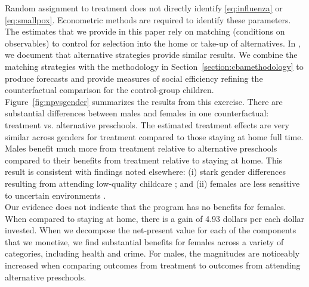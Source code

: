 \noindent Random assignment to treatment does not directly identify \eqref{eq:influenza} or \eqref{eq:smallpox}. Econometric methods are required to identify these parameters. The estimates that we provide in this paper rely on matching (conditions on observables) to control for selection into the home or take-up of alternatives. In \citet{Garcia_Heckman_Ziff_2017_Gender-Diff_UNPUBLISHED}, we document that alternative strategies provide similar results. We combine the matching strategies with the methodology in Section~\ref{section:cbamethodology} to produce forecasts and provide measures of social efficiency refining the counterfactual comparison for the control-group children.\\

\noindent Figure~\ref{fig:npvsgender} summarizes the results from this exercise. There are substantial differences between males and females in one counterfactual: treatment vs. alternative preschools. The estimated treatment effects are very similar across genders for treatment compared to those staying at home full time. Males benefit much more from treatment relative to alternative preschools compared to their benefits from treatment relative to staying at home. This result is consistent with findings noted elsewhere: (i) stark gender differences resulting from attending low-quality childcare \citep{Kottelenberg_Lehrer_2014_Gender-Effects,Baker_Gruber_Milligan_2015_Noncog_Defects}; and (ii) females are less sensitive to uncertain environments \citep{Autor-etal_2015_Family-Disadvantage}.\\

\noindent Our evidence does not indicate that the program has no benefits for females. When compared to staying at home, there is a gain of 4.93 dollars per each dollar invested. When we decompose the net-present value for each of the components that we monetize, we find substantial benefits for females across a variety of categories, including health and crime. For males, the magnitudes are noticeably increased when comparing outcomes from treatment to outcomes from attending alternative preschools.

